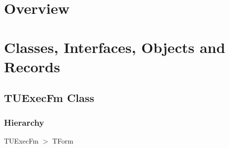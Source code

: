 \documentclass{report}
\newif\ifpdf
\begin{document}
\section{Overview}
\begin{description}
\item[\texttt{\begin{ttfamily}TUExecFm\end{ttfamily} Class}]
\end{description}
\section{Classes, Interfaces, Objects and Records}
\ifpdf
\subsection*{\large{\textbf{TUExecFm Class}}\normalsize\hspace{1ex}\hrulefill}
\else
\subsection*{TUExecFm Class}
\fi
\label{updexec.TUExecFm}
\subsubsection*{\large{\textbf{Hierarchy}}\normalsize\hspace{1ex}\hfill}
TUExecFm {$>$} TForm
\end{document}
